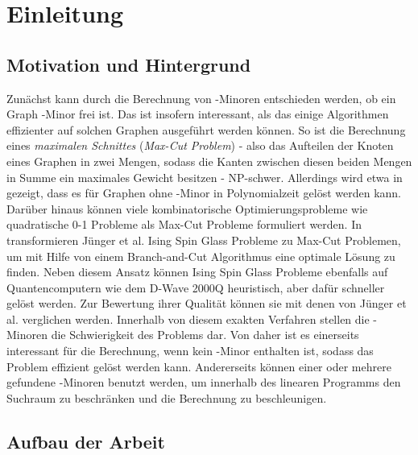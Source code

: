 \chapter{Einleitung}
\label{cha:einleitung}

\section{Motivation und Hintergrund}
\label{sec:motivation_und_hintergrund}
Zunächst kann durch die Berechnung von \kf-Minoren entschieden werden, ob ein Graph \kf-Minor frei ist.
Das ist insofern interessant, als das einige Algorithmen effizienter auf solchen Graphen ausgeführt werden können.
So ist die Berechnung eines \emph{maximalen Schnittes} (\emph{Max-Cut Problem}) - also das Aufteilen der Knoten eines Graphen in zwei Mengen, sodass die Kanten zwischen diesen beiden Mengen in Summe ein maximales Gewicht besitzen - NP-schwer\cite{Kar72}.
Allerdings wird etwa in \cite{Bar83} gezeigt, dass es für Graphen ohne \kf-Minor in Polynomialzeit gelöst werden kann.
Darüber hinaus können viele kombinatorische Optimierungsprobleme wie quadratische 0-1 Probleme als Max-Cut Probleme formuliert werden\cite{BJR89}.
In \cite{JLMR+19} transformieren Jünger et al.\nolinebreak[4]\@\xspace Ising Spin Glass Probleme zu Max-Cut Problemen, um mit Hilfe von einem Branch-and-Cut Algorithmus eine optimale Lösung zu finden.
Neben diesem Ansatz können Ising Spin Glass Probleme ebenfalls auf Quantencomputern wie dem D-Wave 2000Q heuristisch, aber dafür schneller gelöst werden.
Zur Bewertung ihrer Qualität können sie mit denen von Jünger et al.\nolinebreak[4]\@\xspace verglichen werden.
Innerhalb von diesem exakten Verfahren stellen die \kf-Minoren die Schwierigkeit des Problems dar.
Von daher ist es einerseits interessant für die Berechnung, wenn kein \kf-Minor enthalten ist, sodass das Problem effizient gelöst werden kann.
Andererseits können einer oder mehrere gefundene \kf-Minoren benutzt werden, um innerhalb des linearen Programms den Suchraum zu beschränken und die Berechnung zu beschleunigen.

\section{Aufbau der Arbeit}
\label{sec:aufbau}
